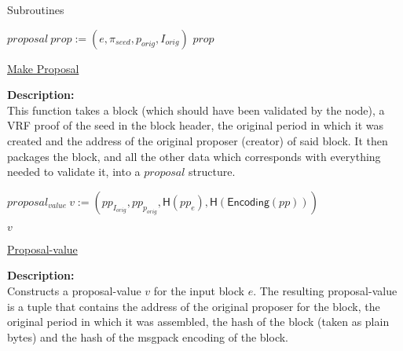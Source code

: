 \documentclass[10pt,a4paper]{article}
\begin{document}
\begin{section}{Subroutines}
\begin{algorithm}[H]
    \begin{algorithmic}[1]

    \State $proposal \ prop := (e, \pi_{seed}, p_{orig}, I_{orig})$
    \Return $prop$

    \EndFunction
    \end{algorithmic}
    \caption{\underline{Make Proposal}}
\end{algorithm}


\noindent \textbf{Description:}\\ This function takes a block (which should have been validated by the node),
a VRF proof of the seed in the block header, the original period in which it was created and the address of the
original proposer (creator) of said block. It then packages the block, and all the other data which corresponds
with everything needed to validate it, into a $proposal$ structure.

\begin{algorithm}[H]\label{proposal-value}
    \begin{algorithmic}[1]

    \State $proposal_{value} \ v := (pp_{I_{orig}}, pp_{p_{orig}}, \mathsf{H}(pp_e), \mathsf{H}(\mathsf{Encoding}(pp)))$

    \Return $v$

    \EndFunction
    \end{algorithmic}
    \caption{\underline{Proposal-value}}
\end{algorithm}

\noindent \textbf{Description:}\\ Constructs a proposal-value $v$ for the input block $e$.
The resulting proposal-value is a tuple that contains the address of the original proposer for
the block, the original period in which it was assembled, the hash of the block (taken as plain bytes) 
and the hash of the msgpack encoding of the block.



\end{section}
\end{document}
